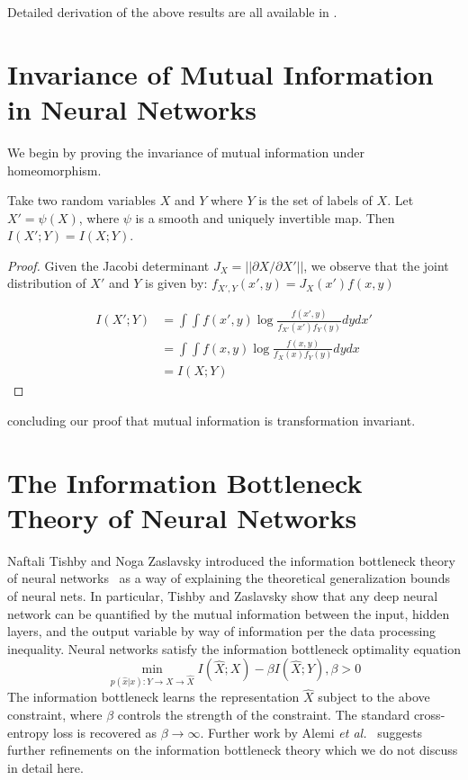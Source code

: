 Detailed derivation of the above results are all available in \cite{coverthomas2006}.

\section{Invariance of Mutual Information in Neural Networks}\label{invariance}

We begin by proving the invariance of mutual information under homeomorphism.

\begin{theorem}
Take two random variables $X$ and $Y$ where $Y$ is the set of labels of $X$.
Let $X' = \psi(X)$, where $\psi$ is a smooth and uniquely invertible map.
Then $I(X'; Y) = I(X; Y)$.
\end{theorem}

\begin{proof}
Given the Jacobi determinant $J_X = ||\partial X/ \partial X'||$, we observe that the joint distribution of $X'$ and $Y$ is given by: $f_{X', Y}(x', y) = J_X(x')f(x, y)$

\begin{align*}
I(X'; Y) & = \int \int f(x', y) \log \frac{f(x', y)}{f_{X'}(x') f_{Y}(y)} dy dx'\\
& = \int \int f(x, y) \log \frac{f(x, y)}{f_{X}(x) f_{Y}(y)} dy dx \\
& = I(X; Y)
\end{align*}
\end{proof}
concluding our proof that mutual information is transformation invariant. 

\section{The Information Bottleneck Theory of Neural Networks}
Naftali Tishby and Noga Zaslavsky introduced the information bottleneck theory of neural networks~\cite{tishby2015deep} as a way of explaining the theoretical generalization bounds of neural nets.
In particular, Tishby and Zaslavsky show that any deep neural network can be quantified by the mutual information between the input, hidden layers, and the output variable by way of information per the data processing inequality.
Neural networks satisfy the information bottleneck optimality equation
$$\min_{p(\hat{x}|x):Y \to X \to \hat{X}} I(\hat{X};X) - \beta I(\hat{X}; Y) , \beta > 0$$
The information bottleneck learns the representation $\hat{X}$ subject to the above constraint, where $\beta$ controls the strength of the constraint.
The standard cross-entropy loss is recovered as $\beta \to \infty$. 
Further work by Alemi \textit{et al.}~\cite{alemi2016deep} suggests further refinements on the information bottleneck theory which we do not discuss in detail here. 

